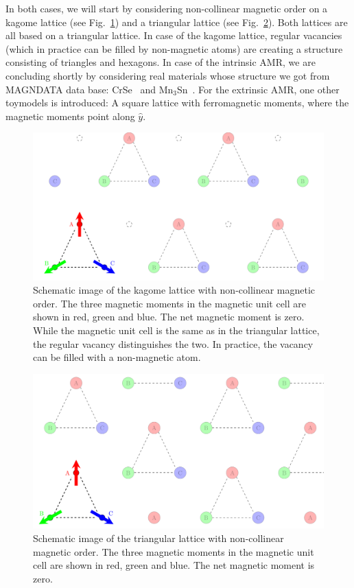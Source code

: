 \documentclass[prb,showpacs,amsmath,amssymb,superscriptaddress,twocolumn,floatfix]{revtex4-1}
\begin{document}
In both cases, we will start by considering non-collinear magnetic order on a kagome lattice (see Fig.~\ref{fig:kagome11}) and a triangular lattice (see Fig.~\ref{fig:trigonal11}). Both lattices are all based on a triangular lattice. In case of the kagome lattice, regular vacancies (which in practice can be filled by non-magnetic atoms) are creating a structure consisting of triangles and hexagons. In case of the intrinsic AMR, we are concluding shortly by considering real materials whose structure we got from MAGNDATA data base: CrSe~\cite{Magndata:CrSe} and Mn$_3$Sn~\cite{Magndata:Mn3Sn}. For the extrinsic AMR, one other toymodels is introduced: A square lattice with ferromagnetic moments, where the magnetic moments point along $\hat{y}$.

\begin{figure}
	\centering
	\includegraphics[width=0.7\linewidth]{img/Kagome_11}
	\caption{Schematic image of the kagome lattice with non-collinear magnetic order. The three magnetic moments in the magnetic unit cell are shown in red, green and blue. The net magnetic moment is zero. While the magnetic unit cell is the same as in the triangular lattice, the regular vacancy distinguishes the two. In practice, the vacancy can be filled with a non-magnetic atom.}
	\label{fig:kagome11}
\end{figure}

\begin{figure}
	\centering
	\includegraphics[width=0.7\linewidth]{img/Trigonal_11}
	\caption{Schematic image of the triangular lattice with non-collinear magnetic order. The three magnetic moments in the magnetic unit cell are shown in red, green and blue. The net magnetic moment is zero.}
	\label{fig:trigonal11}
\end{figure}
\end{document}
